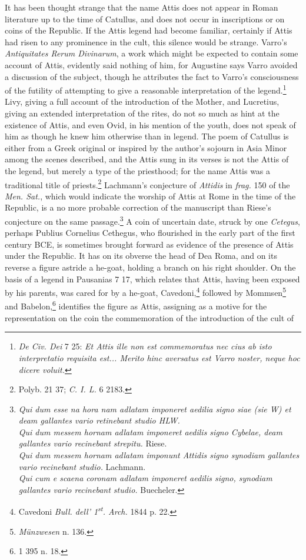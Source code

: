 \documentclass[a4paper, 11pt, oneside, polutonikogreek, french]{article}
\begin{document}
It has been thought strange that the name Attis does not appear in Roman literature up to the time of Catullus, and does not occur in inscriptions or on coins of the Republic. If the Attis legend had become familiar, certainly if Attis had risen to any prominence in the cult, this silence would be strange. Varro's \emph{Antiquitates Rerum Divinarum}, a work which might be expected to contain some account of Attis, evidently said nothing of him, for Augustine says Varro avoided a discussion of the subject, though he attributes the fact to Varro's consciousness of the futility of attempting to give a reasonable interpretation of the legend.\footnote{\emph{De Civ. Dei} 7 25: \emph{Et Attis ille non est commemoratus nec cius ab isto interpretatio requisita est... Merito hinc aversatus est Varro noster, neque hoc dicere voluit.}} Livy, giving a full account of the introduction of the Mother, and Lucretius, giving an extended interpretation of the rites, do not so much as hint at the existence of Attis, and even Ovid, in his mention of the youth, does not speak of him as though he knew him otherwise than in legend. The poem of Catullus is either from a Greek original or inspired by the author's sojourn in Asia Minor among the scenes described, and the Attis sung in its verses is not the Attis of the legend, but merely a type of the priesthood; for the name Attis was a traditional title of priests.\footnote{Polyb. 21 37; \emph{C. I. L.} 6 2183.} Lachmann's conjecture of \emph{Attidis} in \emph{frag.} 150 of the \emph{Men. Sat.}, which would indicate the worship of Attis at Rome in the time of the Republic, is a no more probable correction of the manuscript than Riese's conjecture on the same passage.\footnote{\emph{Qui dum esse na hora nam adlatam imponeret aedilia signo siae (sie W) et deam gallantes vario retinebant studio HLW.}\\\hspace*{10mm}\emph{Qui dum messem hornam adlatam imponeret aedilis signo Cybelae, deam gallantes vario recinebant strepitu.} Riese.\\\hspace*{10mm}\emph{Qui dum messem hornam adlatam imponunt Attidis signo synodiam gallantes vario recinebant studio.} Lachmann.\\\hspace*{10mm}\emph{Qui cum e scaena coronam adlatam imponeret aedilis signo, synodiam gallantes vario recinebant studio.} Buecheler.} A coin of uncertain date, struck by one \emph{Cetegus}, perhaps Publius Cornelius Cethegus, who flourished in the early part of the first century \textsc{BCE}, is sometimes brought forward as evidence of the presence of Attis under the Republic. It has on its obverse the head of Dea Roma, and on its reverse a figure astride a he-goat, holding a branch on his right shoulder. On the basis of a legend in Pausanias 7 17, which relates that Attis, having been exposed by his parents, was cared for by a he-goat, Cavedoni,\footnote{Cavedoni \emph{Bull. dell' 1\textsuperscript{st}. Arch.} 1844 p. 22.} followed by Mommsen\footnote{\emph{Münzwesen} n. 136.} and Babelon,\footnote{1 395 n. 18.} identifies the figure as Attis, assigning as a motive for the representation on the coin the commemoration of the introduction of the cult of 
\end{document}
